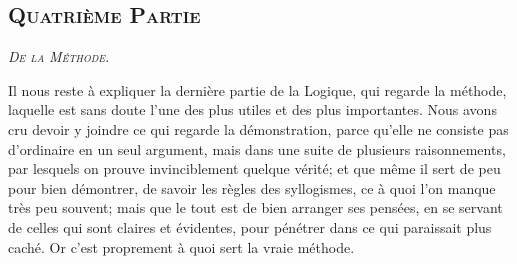 \subsection{\centering \huge \scshape Quatrième Partie}
\begin{center}\emph{\Large\scshape De la Méthode.}\end{center}

Il nous reste à expliquer la dernière partie de la Logique, qui regarde la méthode, laquelle est sans doute l'une des plus utiles et des plus importantes. Nous avons cru devoir y joindre ce qui regarde la démonstration, parce qu'elle ne consiste pas d'ordinaire en un seul argument, mais dans une suite de plusieurs raisonnements, par lesquels on prouve invinciblement quelque vérité; et que même il sert de peu pour bien démontrer, de savoir les règles des syllogismes, ce à quoi l'on manque très peu souvent; mais que le tout est de bien arranger ses pensées, en se servant de celles qui sont claires et évidentes, pour pénétrer dans ce qui paraissait plus caché. Or c'est proprement à quoi sert la vraie méthode.

